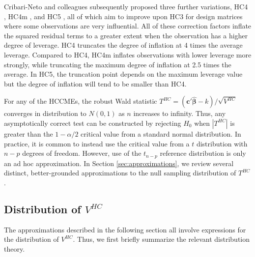 \documentclass[12pt]{article}\usepackage[]{graphicx}\usepackage[]{color}
\newcommand{\bm}{\mathbf}
\newcommand{\bs}{\boldsymbol}
\begin{document}
Cribari-Neto and colleagues subsequently proposed three further variations, HC4 \citep{Cribari-Neto2004asymptotic}, HC4m \citep{Cribari-Neto2011new}, and HC5 \citep{Cribari-Neto2007inference}, all of which aim to improve upon HC3 for design matrices where some observations are very influential. 
All of these correction factors inflate the squared residual terms to a greater extent when the observation has a higher degree of leverage. 
HC4 truncates the degree of inflation at 4 times the average leverage. 
Compared to HC4, HC4m inflates observations with lower leverage more strongly, while truncating the maximum degree of inflation at 2.5 times the average. 
In HC5, the truncation point depends on the maximum leverage value but the degree of inflation will tend to be smaller than HC4. 

For any of the HCCMEs, the robust Wald statistic $T^{HC} = \left(\bm{c}'\bs{\hat\beta} - k\right) / \sqrt{V^{HC}}$ converges in distribution to $N(0,1)$ as $n$ increases to infinity. 
Thus, any asymptotically correct test can be constructed by rejecting $H_0$ when $\left|T^{HC}\right|$ is greater than the $1 - \alpha / 2$ critical value from a standard normal distribution. 
In practice, it is common to instead use the critical value from a $t$ distribution with $n - p$ degrees of freedom. 
However, use of the $t_{n-p}$ reference distribution is only an ad hoc approximation. In Section \ref{sec:approximations}, we review several distinct, better-grounded approximations to the null sampling distribution of $T^{HC}$. 

\subsection{Distribution of $V^{HC}$}
\label{subsec:distribution_theory}

The approximations described in the following section all involve expressions for the distribution of $V^{HC}$. Thus, we first briefly summarize the relevant distribution theory. 
\end{document}
